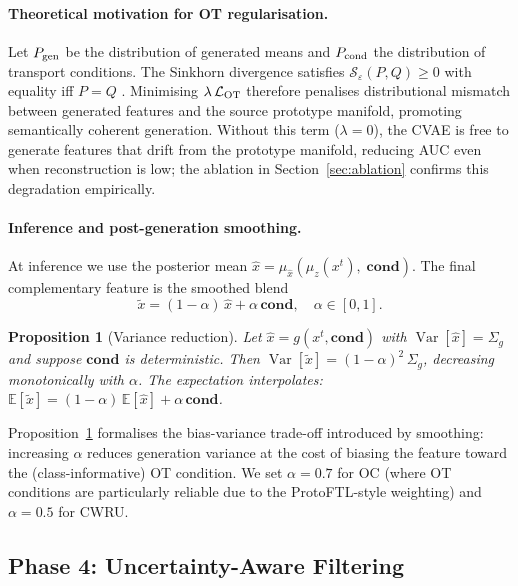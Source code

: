 \documentclass[a4paper,fleqn]{cas-sc}
\newtheorem{proposition}{Proposition}
\begin{document}
\paragraph{Theoretical motivation for OT regularisation.}
Let $P_{\rm gen}$ be the distribution of generated means and $P_{\rm cond}$
the distribution of transport conditions.
The Sinkhorn divergence satisfies $\mathcal{S}_\varepsilon(P,Q)\geq 0$
with equality iff $P=Q$ \citep{Genevay2018}.
Minimising $\lambda\,\mathcal{L}_{\rm OT}$ therefore penalises distributional
mismatch between generated features and the source prototype manifold,
promoting semantically coherent generation.
Without this term ($\lambda=0$), the CVAE is free to generate features
that drift from the prototype manifold, reducing AUC even when
reconstruction is low; the ablation in Section~\ref{sec:ablation}
confirms this degradation empirically.

\paragraph{Inference and post-generation smoothing.}
At inference we use the posterior mean
$\hat x = \mu_{\hat x}(\mu_z(x^t),\;\mathbf{cond})$.
The final complementary feature is the smoothed blend
\begin{equation}
  \tilde x = (1-\alpha)\,\hat x + \alpha\,\mathbf{cond},
  \quad \alpha \in [0,1].
  \label{eq:smooth}
\end{equation}

\begin{proposition}[Variance reduction]
  Let $\hat x = g(x^t,\mathbf{cond})$ with
  $\operatorname{Var}[\hat x] = \Sigma_g$ and suppose $\mathbf{cond}$
  is deterministic.
  Then $\operatorname{Var}[\tilde x] = (1-\alpha)^2\,\Sigma_g$,
  decreasing monotonically with $\alpha$.
  The expectation interpolates:
  $\mathbb{E}[\tilde x] = (1-\alpha)\,\mathbb{E}[\hat x]
  + \alpha\,\mathbf{cond}$.
  \label{prop:smooth}
\end{proposition}

Proposition~\ref{prop:smooth} formalises the bias-variance trade-off
introduced by smoothing: increasing $\alpha$ reduces generation variance
at the cost of biasing the feature toward the (class-informative) OT
condition. We set $\alpha=0.7$ for OC (where OT conditions are particularly
reliable due to the ProtoFTL-style weighting) and $\alpha=0.5$ for CWRU.

\subsection{Phase 4: Uncertainty-Aware Filtering}
\label{sec:phase4}
\end{document}
